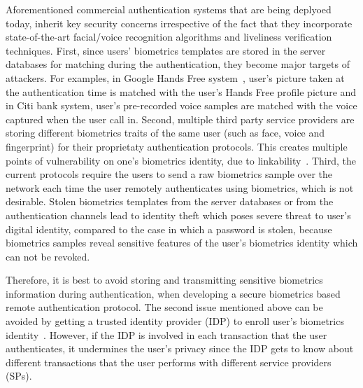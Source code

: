 \documentclass[10pt]{article}
\begin{document}
Aforementioned commercial authentication systems that are being deplyoed today, inherit key security 
concerns irrespective of the fact that they incorporate state-of-the-art facial/voice recognition algorithms and liveliness verification techniques. 
First, since users' biometrics templates are stored in the server databases for matching during the authentication, they become major targets 
of attackers.
For examples, in Google Hands Free system~\cite{google}, user's picture taken at the authentication time is matched with the user's Hands Free 
profile picture and in Citi bank system, user's pre-recorded voice samples are matched with the voice captured when the user call in. Second, 
multiple third party service providers are storing different biometrics traits of the same user (such as face, voice and fingerprint) for their 
proprietaty authentication protocols. This creates multiple points of vulnerability on one's biometrics identity, due to 
linkability~\cite{linkability}. Third, the current protocols require the users to send a raw biometrics sample over the network each time the user 
remotely authenticates using biometrics, which is not desirable.
Stolen biometrics templates from the server databases or from the authentication channels lead to identity theft which poses severe threat to user's 
digital identity, compared to the case in which a password is stolen, because biometrics samples reveal sensitive features of the user's 
biometrics identity which can not be revoked.

Therefore, it is best to avoid storing and transmitting sensitive biometrics information during authentication, when developing a secure biometrics 
based remote authentication protocol.
The second issue mentioned above can be avoided by getting a trusted identity provider (IDP) to enroll user's biometrics identity~\cite{google, 
identityX}. However, if the IDP is involved in each transaction that the user authenticates, it undermines the user's privacy since the IDP gets to 
know about different transactions that the user performs with different service providers (SPs).
  
\end{document}
